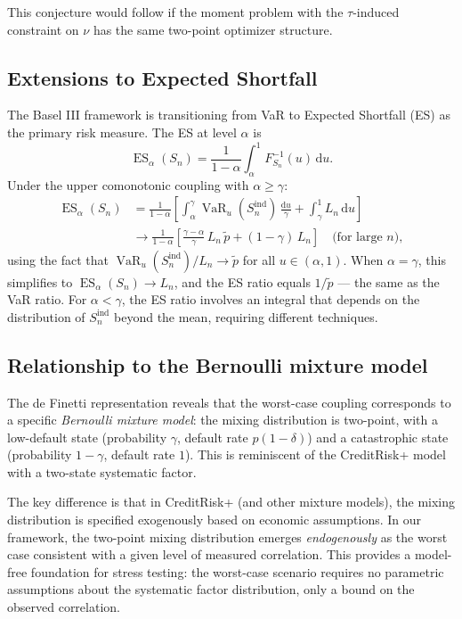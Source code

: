 \documentclass[11pt]{article}
\theoremstyle{definition}
\newcommand{\dd}{\mathrm{d}}
\newcommand{\VaR}{\operatorname{VaR}}
\newcommand{\ES}{\operatorname{ES}}
\newcommand{\1}{\mathbf{1}}
\begin{document}
This conjecture would follow if the moment problem with the $\tau$-induced constraint on $\nu$ has the same two-point optimizer structure.

\subsection{Extensions to Expected Shortfall}

The Basel III framework is transitioning from VaR to Expected Shortfall (ES) as the primary risk measure. The ES at level $\alpha$ is
\[
  \ES_\alpha(S_n) = \frac{1}{1-\alpha}\int_\alpha^1 F_{S_n}^{-1}(u)\,\dd u.
\]
Under the upper comonotonic coupling with $\alpha \geq \gamma$:
\begin{align*}
  \ES_\alpha(S_n) &= \frac{1}{1-\alpha}\left[\int_\alpha^\gamma \VaR_u(S_n^{\mathrm{ind}})\,\frac{\dd u}{\gamma} + \int_\gamma^1 L_n\,\dd u\right] \\
  &\to \frac{1}{1-\alpha}\left[\frac{\gamma - \alpha}{\gamma}\,L_n\,\tilde{p} + (1-\gamma)\,L_n\right]
  \quad\text{(for large $n$)},
\end{align*}
using the fact that $\VaR_u(S_n^{\mathrm{ind}})/L_n \to \tilde{p}$ for all $u \in (\alpha, 1)$. When $\alpha = \gamma$, this simplifies to $\ES_\alpha(S_n) \to L_n$, and the ES ratio equals $1/\tilde{p}$ --- the same as the VaR ratio. For $\alpha < \gamma$, the ES ratio involves an integral that depends on the distribution of $S_n^{\mathrm{ind}}$ beyond the mean, requiring different techniques.

\subsection{Relationship to the Bernoulli mixture model}

The de Finetti representation reveals that the worst-case coupling corresponds to a specific \emph{Bernoulli mixture model}: the mixing distribution is two-point, with a low-default state (probability $\gamma$, default rate $p(1-\delta)$) and a catastrophic state (probability $1-\gamma$, default rate $1$). This is reminiscent of the CreditRisk+ model \citep{CreditSuisse1997} with a two-state systematic factor.

The key difference is that in CreditRisk+ (and other mixture models), the mixing distribution is specified exogenously based on economic assumptions. In our framework, the two-point mixing distribution emerges \emph{endogenously} as the worst case consistent with a given level of measured correlation. This provides a model-free foundation for stress testing: the worst-case scenario requires no parametric assumptions about the systematic factor distribution, only a bound on the observed correlation.
\end{document}
